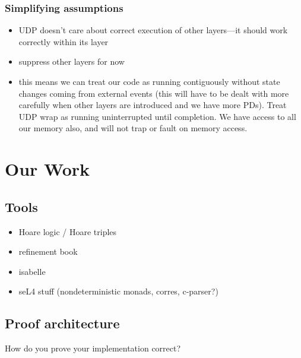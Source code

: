 \documentclass[twoside]{memoir}
\begin{document}
\subsection{Simplifying assumptions}
\begin{itemize}
    \item UDP doesn't care about correct execution of other layers---it should work correctly within its layer
    \item suppress other layers for now
    \item this means we can treat our code as running contiguously without state changes coming from external events (this will have to be dealt with more carefully when other layers are introduced and we have more PDs).
        Treat UDP wrap as running uninterrupted until completion.
        We have access to all our memory also, and will not trap or fault on memory access.
\end{itemize}

\chapter{Our Work}

\section{Tools}

\begin{itemize}
    \item Hoare logic / Hoare triples
    \item refinement book
    \item isabelle
    \item seL4 stuff (nondeterministic monads, corres, c-parser?)
\end{itemize}

\section{Proof architecture}
How do you prove your implementation correct?
\end{document}
